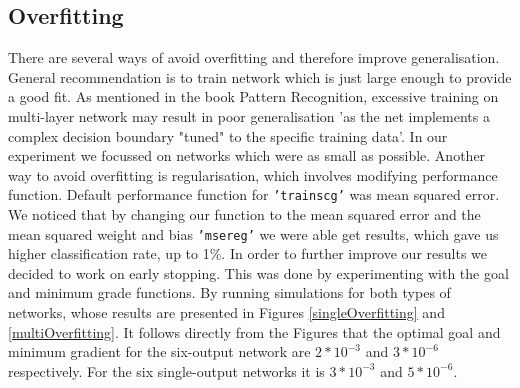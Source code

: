 \documentclass[a4paper]{article}
\begin{document}
\clearpage

\subsection{Overfitting}

There are several ways of avoid overfitting and therefore improve generalisation. General recommendation is to train network which is just large enough to provide a good fit. As mentioned in the book Pattern Recognition, excessive training on multi-layer network may result in poor generalisation 'as the net implements a complex decision boundary "tuned" to the specific training data'. In our experiment we focussed on networks which were as small as possible. Another way to avoid overfitting is regularisation, which involves modifying performance function. Default performance function for \texttt{'trainscg'} was mean squared error. We noticed that by changing our function to the mean squared error and the mean squared weight and bias \texttt{'msereg'} we were able get results, which gave us higher classification rate, up to 1\%. In order to further improve our results we decided to work on early stopping. This was done by experimenting with the goal and minimum grade functions. By running simulations for both types of networks, whose results are presented in Figures \ref{singleOverfitting} and \ref{multiOverfitting}. It follows directly from the Figures that the optimal goal and minimum gradient for the six-output network are $2*10^{-3}$ and $3*10^{-6}$ respectively. For the six single-output networks it is $3*10^{-3}$ and $5*10^{-6}$.
\end{document}
